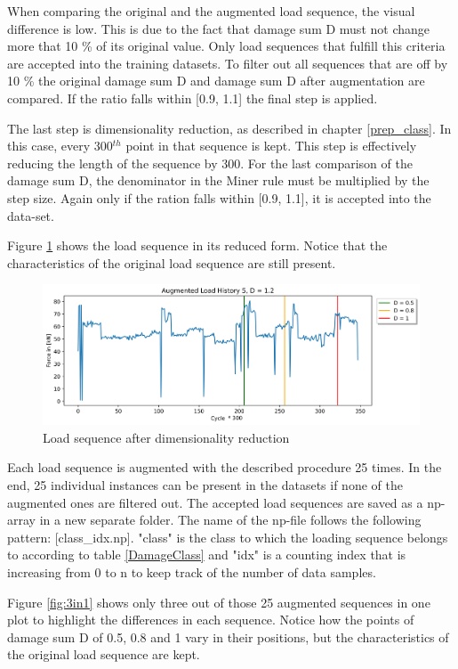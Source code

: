 When comparing the original and the augmented load sequence, the visual difference is low. This is due to the fact that damage sum D must not change more that 10 \% of its original value. Only load sequences that fulfill this criteria are accepted into the training datasets.
To filter out all sequences that are off by 10 \% the original damage sum D and damage sum D after augmentation are compared.
If the ratio falls within [0.9, 1.1] the final step is applied.


The last step is dimensionality reduction, as described in chapter \ref{prep_class}. In this case, every 300\(^{th}\) point in that sequence is kept. This step is effectively reducing the length of the sequence by 300. For the last comparison of the damage sum D, the denominator in the Miner rule must be multiplied by the step size. Again only if the ration falls within [0.9, 1.1], it is accepted into the data-set. 

Figure \ref{fig:Verlauf_5_reduced} shows the load sequence in its reduced form. Notice that the characteristics of the original load sequence are still present.
 
\begin{figure}[H]
	\centering
	\includegraphics[width=1\linewidth]{IMGs/Verlauf_5_reduced.png}
	\caption{Load sequence after dimensionality reduction}
	\label{fig:Verlauf_5_reduced}
\end{figure}

Each load sequence is augmented with the described procedure 25 times. In the end, 25 individual instances can be present in the datasets if none of the augmented ones are filtered out. 
The accepted load sequences are saved as a np-array in a new separate folder. The name of the np-file follows the following pattern: [class\_idx.np]. "class" is the class to which the loading sequence belongs to according to table \ref{DamageClass} and "idx" is a counting index that is increasing from 0 to n to keep track of the number of data samples.

Figure \ref{fig:3in1} shows only three out of those 25 augmented sequences in one plot to highlight the differences in each sequence.
Notice how the points of damage sum D of 0.5, 0.8 and 1 vary in their positions, but the characteristics of the original load sequence are kept.

